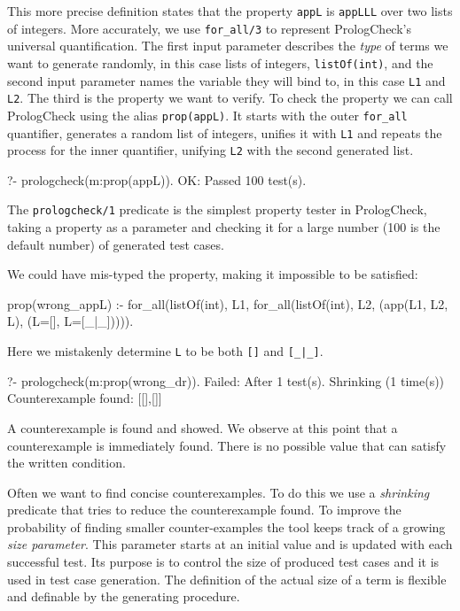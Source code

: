 \documentclass[runningheads,a4paper]{../../PaperStyles/llncs}
\newcommand{\yap}[1]{\lstinline[style=yap]{#1}}
\newcommand{\plqc}[0]{{\sf PrologCheck}}
\begin{document}
This more precise definition states that the property \yap{appL} is \yap{appLLL}
over two lists of integers.
%
More accurately, we use \yap{for_all/3} to represent \plqc{}'s universal quantification.
%
The first input parameter describes the \emph{type} of terms we want to
generate randomly, in this case lists of integers,
\yap{listOf(int)}, 
and the second input parameter names the variable they will bind to, in this case
\yap{L1} and \yap{L2}.
%
The third is the property we want to verify.
%
To check the property we can call \plqc{} using the alias
\yap{prop(appL)}.
%
It starts with the outer \yap{for_all} quantifier, generates a random
list of integers, unifies it with \yap{L1} and repeats the process for
the inner quantifier, unifying \yap{L2} with the second generated list.
%
\begin{yapcode}
   ?- prologcheck(m:prop(appL)).
 OK: Passed 100 test(s).
\end{yapcode}
%
The \yap{prologcheck/1} predicate is the simplest property tester in
\plqc{}, taking a property as a parameter and checking it for a large
number (100 is the default number) of generated test cases.
%


We could have mis-typed the property, making it impossible to be satisfied:
%
\begin{yapcode}
 prop(wrong_appL) :- for_all(listOf(int), L1,
   for_all(listOf(int), L2, (app(L1, L2, L), (L=[], L=[_|_])))).
\end{yapcode}
%
Here we mistakenly determine \yap{L} to be both  \yap{[]} and  \yap{[_|_]}.
%
\begin{yapcode}
   ?- prologcheck(m:prop(wrong_dr)).
 Failed: After 1 test(s).
 Shrinking (1 time(s))
 Counterexample found: [[],[]]
\end{yapcode}
A counterexample is found and showed.
%
We observe at this point that a counterexample is immediately found.
%
There is no possible value that can satisfy the written condition.
%


Often we want to find concise counterexamples.
%
To do this we use a \emph{shrinking} predicate that tries to reduce the
counterexample found.
%
To improve the probability of finding smaller counter-examples the tool
keeps track of a growing \emph{size parameter}.
%
This parameter  starts at an initial value and is updated with each
successful test.
%
Its purpose is to control the size of produced test cases and it is used
in test case generation.
%
The definition of the actual size of a term is flexible and definable by
the generating procedure. 
\end{document}
